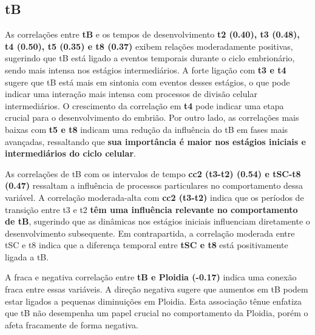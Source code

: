\subsection*{tB}
As correlações entre \textbf{tB} e os tempos de desenvolvimento \textbf{t2 (0.40), t3 (0.48), t4 (0.50), t5 (0.35) e t8 (0.37)} exibem relações moderadamente positivas, sugerindo que tB está ligado a eventos temporais durante o ciclo embrionário, sendo mais intensa nos estágios intermediários. A forte ligação com \textbf{t3 e t4} sugere que tB está mais em sintonia com eventos desses estágios, o que pode indicar uma interação mais intensa com processos de divisão celular intermediários. O crescimento da correlação em \textbf{t4} pode indicar uma etapa crucial para o desenvolvimento do embrião. Por outro lado, as correlações mais baixas com \textbf{t5 e t8} indicam uma redução da influência do tB em fases mais avançadas, ressaltando que \textbf{sua importância é maior nos estágios iniciais e intermediários do ciclo celular}.

As correlações de tB com os intervalos de tempo \textbf{cc2 (t3-t2) (0.54) e tSC-t8 (0.47)} ressaltam a influência de processos particulares no comportamento dessa variável. A correlação moderada-alta com \textbf{cc2 (t3-t2)} indica que os períodos de transição entre t3 e t2 \textbf{têm uma influência relevante no comportamento de tB}, sugerindo que as dinâmicas nos estágios iniciais influenciam diretamente o desenvolvimento subsequente. Em contrapartida, a correlação moderada entre tSC e t8 indica que a diferença temporal entre \textbf{tSC e t8} está positivamente ligada a tB. 

A fraca e negativa correlação entre \textbf{tB e Ploidia (-0.17)} indica uma conexão fraca entre essas variáveis. A direção negativa sugere que aumentos em tB podem estar ligados a pequenas diminuições em Ploidia. Esta associação tênue enfatiza que tB não desempenha um papel crucial no comportamento da Ploidia, porém o afeta fracamente de forma negativa.


